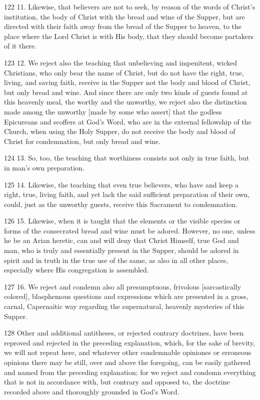 122 11. Likewise, that believers are not to seek, by reason of the words of Christ’s institution, the body of Christ with the bread and wine of the Supper, but are directed with their faith away from the bread of the Supper to heaven, to the place where the Lord Christ is with His body, that they should become partakers of it there.

123 12. We reject also the teaching that unbelieving and impenitent, wicked Christians, who only bear the name of Christ, but do not have the right, true, living, and saving faith, receive in the Supper not the body and blood of Christ, but only bread and wine. And since there are only two kinds of guests found at this heavenly meal, the worthy and the unworthy, we reject also the distinction made among the unworthy [made by some who assert] that the godless Epicureans and scoffers at God’s Word, who are in the external fellowship of the Church, when using the Holy Supper, do not receive the body and blood of Christ for condemnation, but only bread and wine.

124 13. So, too, the teaching that worthiness consists not only in true faith, but in man’s own preparation.

125 14. Likewise, the teaching that even true believers, who have and keep a right, true, living faith, and yet lack the said sufficient preparation of their own, could, just as the unworthy guests, receive this Sacrament to condemnation.

126 15. Likewise, when it is taught that the elements or the visible species or forms of the consecrated bread and wine must be adored. However, no one, unless he be an Arian heretic, can and will deny that Christ Himself, true God and man, who is truly and essentially present in the Supper, should be adored in spirit and in truth in the true use of the same, as also in all other places, especially where His congregation is assembled.

127 16. We reject and condemn also all presumptuous, frivolous [sarcastically colored], blasphemous questions and expressions which are presented in a gross, carnal, Capernaitic way regarding the supernatural, heavenly mysteries of this Supper.

128 Other and additional antitheses, or rejected contrary doctrines, have been reproved and rejected in the preceding explanation, which, for the sake of brevity, we will not repeat here, and whatever other condemnable opiniones or erroneous opinions there may be still, over and above the foregoing, can be easily gathered and named from the preceding explanation; for we reject and condemn everything that is not in accordance with, but contrary and opposed to, the doctrine recorded above and thoroughly grounded in God’s Word.

